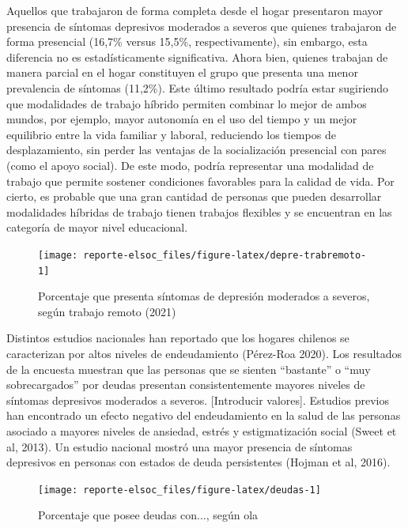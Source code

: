 \documentclass[
  12pt,
]{book}
\begin{document}
Aquellos que trabajaron de forma completa desde el hogar presentaron mayor presencia de síntomas depresivos moderados a severos que quienes trabajaron de forma presencial (16,7\% versus 15,5\%, respectivamente), sin embargo, esta diferencia no es estadísticamente significativa. Ahora bien, quienes trabajan de manera parcial en el hogar constituyen el grupo que presenta una menor prevalencia de síntomas (11,2\%). Este último resultado podría estar sugiriendo que modalidades de trabajo híbrido permiten combinar lo mejor de ambos mundos, por ejemplo, mayor autonomía en el uso del tiempo y un mejor equilibrio entre la vida familiar y laboral, reduciendo los tiempos de desplazamiento, sin perder las ventajas de la socialización presencial con pares (como el apoyo social). De este modo, podría representar una modalidad de trabajo que permite sostener condiciones favorables para la calidad de vida. Por cierto, es probable que una gran cantidad de personas que pueden desarrollar modalidades híbridas de trabajo tienen trabajos flexibles y se encuentran en las categoría de mayor nivel educacional.

\begin{figure}

{\centering \texttt{[image: reporte-elsoc\_files/figure-latex/depre-trabremoto-1]} 

}

\caption{Porcentaje que presenta síntomas de depresión moderados a severos, según trabajo remoto (2021)}\label{fig:depre-trabremoto}
\end{figure}

Distintos estudios nacionales han reportado que los hogares chilenos se caracterizan por altos niveles de endeudamiento (Pérez-Roa 2020). Los resultados de la encuesta muestran que las personas que se sienten ``bastante'' o ``muy sobrecargados'' por deudas presentan consistentemente mayores niveles de síntomas depresivos moderados a severos. {[}Introducir valores{]}. Estudios previos han encontrado un efecto negativo del endeudamiento en la salud de las personas asociado a mayores niveles de ansiedad, estrés y estigmatización social (Sweet et al, 2013). Un estudio nacional mostró una mayor presencia de síntomas depresivos en personas con estados de deuda persistentes (Hojman et al, 2016).

\begin{figure}

{\centering \texttt{[image: reporte-elsoc\_files/figure-latex/deudas-1]} 

}

\caption{Porcentaje que posee deudas con..., según ola}\label{fig:deudas}
\end{figure}
\end{document}
